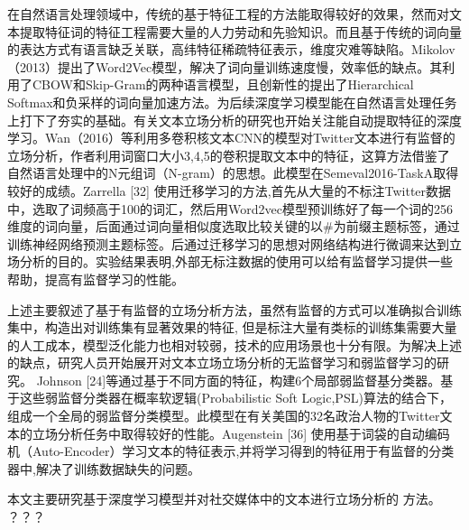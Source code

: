 在自然语言处理领域中，传统的基于特征工程的方法能取得较好的效果，然而对文本提取特征词的特征工程需要大量的人力劳动和先验知识。而且基于传统的词向量的表达方式有语言缺乏关联，高纬特征稀疏特征表示，维度灾难等缺陷。Mikolov（2013）提出了Word2Vec模型，解决了词向量训练速度慢，效率低的缺点。其利用了CBOW和Skip-Gram的两种语言模型，且创新性的提出了Hierarchical Softmax和负采样的词向量加速方法。为后续深度学习模型能在自然语言处理任务上打下了夯实的基础。有关文本立场分析的研究也开始关注能自动提取特征的深度学习。Wan（2016）等利用多卷积核文本CNN的模型对Twitter文本进行有监督的立场分析，作者利用词窗口大小3,4,5的卷积提取文本中的特征，这算方法借鉴了自然语言处理中的N元组词（N-gram）的思想。此模型在Semeval2016-TaskA取得较好的成绩。Zarrella [32] 使用迁移学习的方法,首先从大量的不标注Twitter数据中，选取了词频高于100的词汇，然后用Word2vec模型预训练好了每一个词的256维度的词向量，后面通过词向量相似度选取比较关键的以\#为前缀主题标签，通过训练神经网络预测主题标签。后通过迁移学习的思想对网络结构进行微调来达到立场分析的目的。实验结果表明,外部无标注数据的使用可以给有监督学习提供一些帮助，提高有监督学习的性能。

上述主要叙述了基于有监督的立场分析方法，虽然有监督的方式可以准确拟合训练集中，构造出对训练集有显著效果的特征, 但是标注大量有类标的训练集需要大量的人工成本，模型泛化能力也相对较弱，技术的应用场景也十分有限。为解决上述的缺点，研究人员开始展开对文本立场立场分析的无监督学习和弱监督学习的研究。 Johnson [24]等通过基于不同方面的特征，构建6个局部弱监督基分类器。基于这些弱监督分类器在概率软逻辑(Probabilistic Soft Logic,PSL)算法的结合下，组成一个全局的弱监督分类模型。此模型在有关美国的32名政治人物的Twitter文本的立场分析任务中取得较好的性能。Augenstein [36] 使用基于词袋的自动编码机（Auto-Encoder）学习文本的特征表示,并将学习得到的特征用于有监督的分类器中,解决了训练数据缺失的问题。




本文主要研究基于深度学习模型并对社交媒体中的文本进行立场分析的
方法。
？？？
